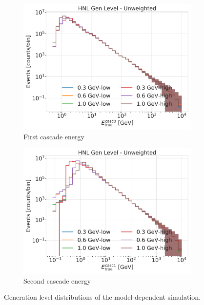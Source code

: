 \begin{figure}[h]
\begin{subfigure}{0.49\linewidth}
        \includegraphics{figures/hnl_simulation/generation/1_d_distr_casc0_true_energy_gen_level_unweighted.png}
        \caption{First cascade energy}
    \end{subfigure}
    \begin{subfigure}{0.49\linewidth}
        \includegraphics{figures/hnl_simulation/generation/1_d_distr_casc1_true_energy_gen_level_unweighted.png}
        \caption{Second cascade energy}
    \end{subfigure}
    \caption[Model-dependent simulation generation level distributions]{Generation level distributions of the model-dependent simulation.}
\end{figure}


